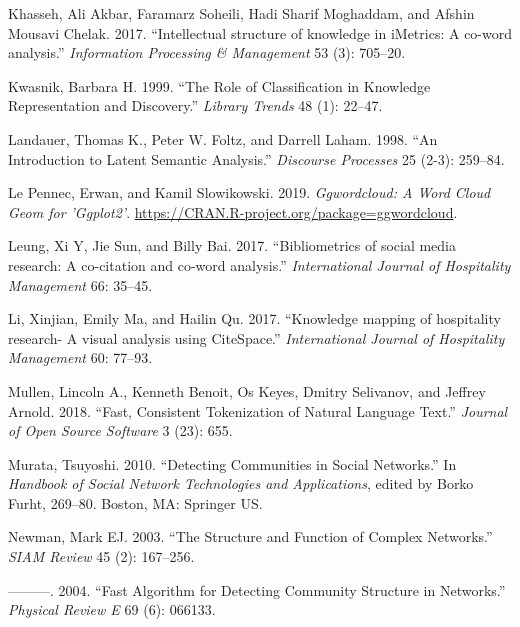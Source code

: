 \begin{CSLReferences}{1}{0}
\leavevmode{}%
Khasseh, Ali Akbar, Faramarz Soheili, Hadi Sharif Moghaddam, and Afshin Mousavi Chelak. 2017. {``{Intellectual structure of knowledge in iMetrics: A co-word analysis}.''} \emph{Information Processing \& Management} 53 (3): 705--20.

\leavevmode{}%
Kwasnik, Barbara H. 1999. {``The Role of Classification in Knowledge Representation and Discovery.''} \emph{Library Trends} 48 (1): 22--47.

\leavevmode{}%
Landauer, Thomas K., Peter W. Foltz, and Darrell Laham. 1998. {``An Introduction to Latent Semantic Analysis.''} \emph{Discourse Processes} 25 (2-3): 259--84.

\leavevmode{}%
Le Pennec, Erwan, and Kamil Slowikowski. 2019. \emph{Ggwordcloud: A Word Cloud Geom for 'Ggplot2'}. \url{https://CRAN.R-project.org/package=ggwordcloud}.

\leavevmode{}%
Leung, Xi Y, Jie Sun, and Billy Bai. 2017. {``{Bibliometrics of social media research: A co-citation and co-word analysis}.''} \emph{International Journal of Hospitality Management} 66: 35--45.

\leavevmode{}%
Li, Xinjian, Emily Ma, and Hailin Qu. 2017. {``{Knowledge mapping of hospitality research- A visual analysis using CiteSpace}.''} \emph{International Journal of Hospitality Management} 60: 77--93.

\leavevmode{}%
Mullen, Lincoln A., Kenneth Benoit, Os Keyes, Dmitry Selivanov, and Jeffrey Arnold. 2018. {``Fast, Consistent Tokenization of Natural Language Text.''} \emph{Journal of Open Source Software} 3 (23): 655.

\leavevmode{}%
Murata, Tsuyoshi. 2010. {``Detecting Communities in Social Networks.''} In \emph{Handbook of Social Network Technologies and Applications}, edited by Borko Furht, 269--80. Boston, MA: Springer US.

\leavevmode{}%
Newman, Mark EJ. 2003. {``The Structure and Function of Complex Networks.''} \emph{SIAM Review} 45 (2): 167--256.

\leavevmode{}%
---------. 2004. {``Fast Algorithm for Detecting Community Structure in Networks.''} \emph{Physical Review E} 69 (6): 066133.


\end{CSLReferences}
